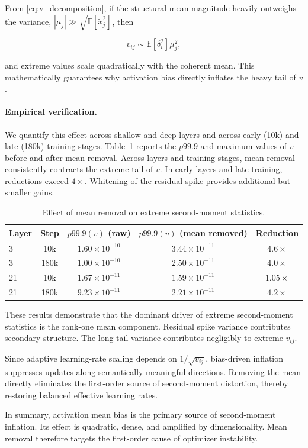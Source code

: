 From \eqref{eq:v_decomposition}, if the structural mean magnitude heavily outweighs the variance, $|\mu_j| \gg \sqrt{\mathbb{E}[\tilde{x}_j^2]}$,
then

\begin{equation}
v_{ij} \sim \mathbb{E}[\delta_i^2] \mu_j^2,
\end{equation}

and extreme values scale quadratically with the coherent mean.
This mathematically guarantees why activation bias directly inflates
the heavy tail of $v$.

\paragraph{Empirical verification.}

We quantify this effect across shallow and deep layers
and across early (10k) and late (180k) training stages.
Table~\ref{tab:adam_v_bias} reports the $p99.9$ and maximum values
of $v$ before and after mean removal. Across layers and training stages,
mean removal consistently contracts the extreme tail of $v$.
In early layers and late training,
reductions exceed $4\times$.
Whitening of the residual spike provides additional but smaller gains.


\begin{table}[t]
\centering
\caption{Effect of mean removal on extreme second-moment statistics.}
\label{tab:adam_v_bias}
\begin{tabular}{lcccc}
\toprule
Layer & Step & $p99.9(v)$ (raw) & $p99.9(v)$ (mean removed) & Reduction \\
\midrule
3 & 10k  & $1.60\times10^{-10}$ & $3.44\times10^{-11}$ & $4.6\times$ \\
3 & 180k & $1.00\times10^{-10}$ & $2.50\times10^{-11}$ & $4.0\times$ \\
21 & 10k & $1.67\times10^{-11}$ & $1.59\times10^{-11}$ & $1.05\times$ \\
21 & 180k& $9.23\times10^{-11}$ & $2.21\times10^{-11}$ & $4.2\times$ \\
\bottomrule
\end{tabular}
\end{table}


These results demonstrate that the dominant driver of extreme second-moment statistics is the rank-one mean component. Residual spike variance contributes secondary structure. The long-tail variance contributes negligibly to extreme $v_{ij}$.

Since adaptive learning-rate scaling depends on $1/\sqrt{v_{ij}}$,
bias-driven inflation suppresses updates along semantically meaningful
directions.
Removing the mean directly eliminates the first-order source of
second-moment distortion,
thereby restoring balanced effective learning rates.


In summary, activation mean bias is the primary source of second-moment inflation.
Its effect is quadratic, dense, and amplified by dimensionality.
Mean removal therefore targets the first-order cause
of optimizer instability.